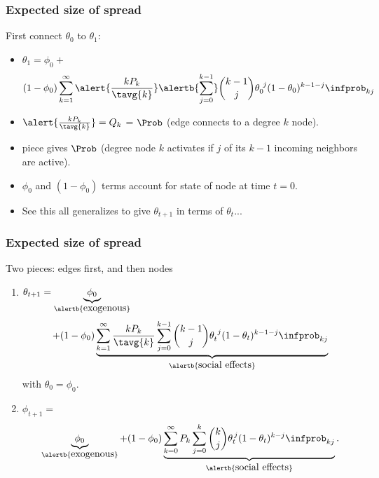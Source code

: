 \begin{frame}
  \frametitle{Expected size of spread}
  
  \begin{block}{First connect $\theta_0$ to $\theta_1$:}
    \begin{itemize}
    \item<1->
      $
      \theta_{1}
      =
      \phi_0 +
      $
      $$
      (1-\phi_0)
      \sum_{k=1}^{\infty}
      \alert{\frac{k P_k}{\tavg{k}}}
      \alertb{\sum_{j=0}^{k-1}}
      \binom{k-1}{j}
      \theta_{0}^{\ j}
      (1-\theta_{0})^{k-1-j}
      \infprob_{kj}
      $$
    \item<1->
      $ \alert{\frac{kP_k}{\tavg{k}}} = Q_k$ = $\Prob$ (edge connects to a degree $k$ node).
    \item<1->
       piece gives $\Prob$ (degree node $k$ activates
      if $j$ of its $k-1$ incoming neighbors are active).
    \item<1->
      $\phi_0$ and $(1-\phi_0)$ terms account for state of node at time $t=0$.
    \item<2->
      See this all generalizes to give $\theta_{t+1}$ in terms of $\theta_{t}$...
    \end{itemize}
  \end{block}
\end{frame}

\begin{frame}
  \frametitle{Expected size of spread}
  
  \begin{block}{Two pieces: edges first, and then nodes}
    \begin{enumerate}
    \item<1->
      $
      \theta_{t+1}
      =
      \underbrace{\phi_0}_{\alertb{\mbox{exogenous}}} 
      $
      $$
      +
      (1-\phi_0)
      \underbrace{
      \sum_{k=1}^{\infty}
      \frac{k P_k}{\tavg{k}}
      \sum_{j=0}^{k-1}
      \binom{k-1}{j}
      \theta_{t}^{\ j}
      (1-\theta_{t})^{k-1-j}
      \infprob_{kj}
      }_{\alertb{\mbox{social effects}}}
      $$
      with $\theta_0 = \phi_0$.
    \item<1->
      $ 
      \phi_{t+1}
      = 
      $
      $$
      \underbrace{\phi_0}_{\alertb{\mbox{exogenous}}} 
      + 
      (1-\phi_{0})
      \underbrace{
      \sum_{k=0}^{\infty}
      P_k
      \sum_{j=0}^{k}
      \binom{k}{j}
      \theta_t^{\, j}
      (1-\theta_t)^{k-j} 
      \infprob_{kj}
      }_{\alertb{\mbox{social effects}}}.
      $$
    \end{enumerate}
  \end{block}


\end{frame}


